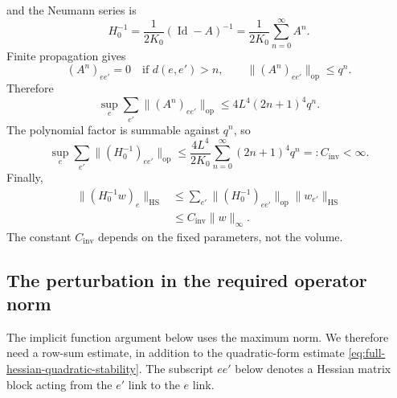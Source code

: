 \documentclass[10pt,reqno]{amsart}
\theoremstyle{definition}
\theoremstyle{remark}
\numberwithin{equation}{section}
\numberwithin{figure}{section}
\begin{document}
and the Neumann series is
\begin{equation}\label{eq:inverse-neumann-series}
H_0^{-1}=\frac1{2K_0}(\operatorname{Id}-A)^{-1}
=\frac1{2K_0}\sum_{n=0}^\infty A^n.
\end{equation}
Finite propagation gives
\begin{equation}\label{eq:inverse-neumann-propagation}
(A^n)_{ee'}=0\quad\text{if }d(e,e')>n,\qquad
\|(A^n)_{ee'}\|_{\mathrm{op}}\le q^n.
\end{equation}
Therefore
\begin{equation}\label{eq:inverse-neumann-row-sum}
\sup_e\sum_{e'}\|(A^n)_{ee'}\|_{\mathrm{op}}
\le4L^4(2n+1)^4q^n.
\end{equation}
The polynomial factor is summable against $q^n$, so
\begin{equation}\label{eq:uniform-inverse-row-sum}
\sup_e\sum_{e'}\|(H_0^{-1})_{ee'}\|_{\mathrm{op}}
\le\frac{4L^4}{2K_0}\sum_{n=0}^\infty(2n+1)^4q^n=:C_{\mathrm{inv}}<\infty.
\end{equation}
Finally,
\begin{equation}\label{eq:uniform-maximum-inverse-bound}
\begin{aligned}
\|(H_0^{-1}w)_e\|_{\mathrm{HS}}
&\le\sum_{e'}\|(H_0^{-1})_{ee'}\|_{\mathrm{op}}
\|w_{e'}\|_{\mathrm{HS}}\\
&\le C_{\mathrm{inv}}\|w\|_\infty.
\end{aligned}
\end{equation}
The constant $C_{\mathrm{inv}}$ depends on the fixed parameters, not the volume.

\subsection{The perturbation in the required operator norm}
The implicit function argument below uses the maximum norm. We therefore
need a row-sum estimate, in addition to the quadratic-form estimate
\eqref{eq:full-hessian-quadratic-stability}. The subscript $ee'$ below
denotes a Hessian matrix block acting from the $e'$ link to the $e$ link.
\end{document}
